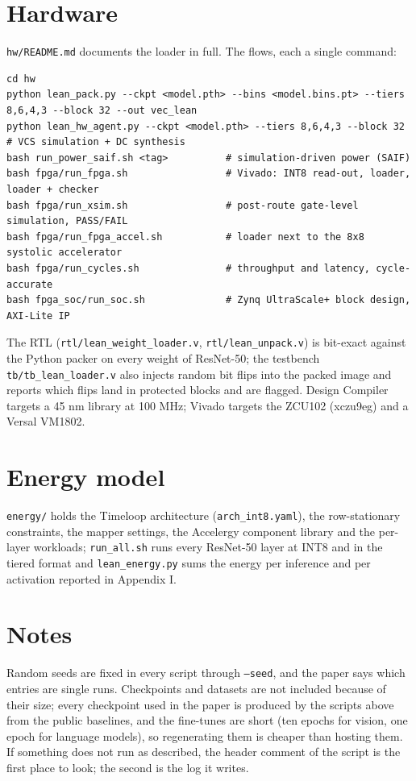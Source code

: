 \documentclass[11pt]{article}
\begin{document}
\section{Hardware}\label{sec:hw}
\texttt{hw/README.md} documents the loader in full. The flows, each a single command:
\begin{lstlisting}
cd hw
python lean_pack.py --ckpt <model.pth> --bins <model.bins.pt> --tiers 8,6,4,3 --block 32 --out vec_lean
python lean_hw_agent.py --ckpt <model.pth> --tiers 8,6,4,3 --block 32   # VCS simulation + DC synthesis
bash run_power_saif.sh <tag>          # simulation-driven power (SAIF)
bash fpga/run_fpga.sh                 # Vivado: INT8 read-out, loader, loader + checker
bash fpga/run_xsim.sh                 # post-route gate-level simulation, PASS/FAIL
bash fpga/run_fpga_accel.sh           # loader next to the 8x8 systolic accelerator
bash fpga/run_cycles.sh               # throughput and latency, cycle-accurate
bash fpga_soc/run_soc.sh              # Zynq UltraScale+ block design, AXI-Lite IP
\end{lstlisting}
The RTL (\texttt{rtl/lean\_weight\_loader.v}, \texttt{rtl/lean\_unpack.v}) is bit-exact against the Python packer on every weight of ResNet-50; the testbench \texttt{tb/tb\_lean\_loader.v} also injects random bit flips into the packed image and reports which flips land in protected blocks and are flagged. Design Compiler targets a 45 nm library at 100 MHz; Vivado targets the ZCU102 (xczu9eg) and a Versal VM1802.

\section{Energy model}
\texttt{energy/} holds the Timeloop architecture (\texttt{arch\_int8.yaml}), the row-stationary constraints, the mapper settings, the Accelergy component library and the per-layer workloads; \texttt{run\_all.sh} runs every ResNet-50 layer at INT8 and in the tiered format and \texttt{lean\_energy.py} sums the energy per inference and per activation reported in Appendix I.

\section{Notes}
Random seeds are fixed in every script through \texttt{--seed}, and the paper says which entries are single runs. Checkpoints and datasets are not included because of their size; every checkpoint used in the paper is produced by the scripts above from the public baselines, and the fine-tunes are short (ten epochs for vision, one epoch for language models), so regenerating them is cheaper than hosting them. If something does not run as described, the header comment of the script is the first place to look; the second is the log it writes.
\end{document}

